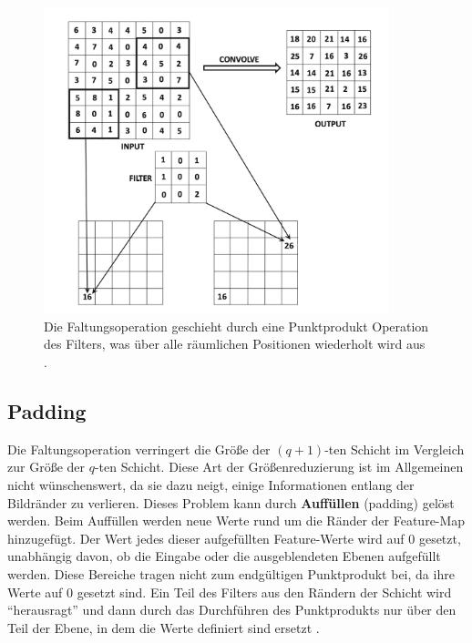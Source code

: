     \begin{figure}[H]
        \centering
        \includegraphics[width=10cm]{kapitel2/conv_layers.png}
        \caption[Die Faltung in einem CNN]{Die Faltungsoperation geschieht durch eine Punktprodukt Operation des Filters, was über alle räumlichen Positionen wiederholt wird aus \cite*[321]{Aggarwal2018}.}
        \label{Kap2:Conv}
    \end{figure}

    \subsection{Padding}
    Die Faltungsoperation verringert die Größe der $(q + 1)$-ten Schicht im Vergleich zur Größe der $q$-ten Schicht. Diese Art der Größenreduzierung ist im Allgemeinen nicht wünschenswert, da sie dazu neigt, einige Informationen entlang der Bildränder zu verlieren. Dieses Problem kann durch \textbf{Auffüllen} (padding) gelöst werden. Beim Auffüllen werden neue Werte rund um die Ränder der Feature-Map hinzugefügt. Der Wert jedes dieser aufgefüllten Feature-Werte wird auf 0 gesetzt, unabhängig davon, ob die Eingabe oder die ausgeblendeten Ebenen aufgefüllt werden. Diese Bereiche tragen nicht zum endgültigen Punktprodukt bei, da ihre Werte auf 0 gesetzt sind. Ein Teil des Filters aus den Rändern der Schicht wird \enquote{herausragt} und dann durch das Durchführen des Punktprodukts nur über den Teil der Ebene, in dem die Werte definiert sind ersetzt \cite*[323]{Aggarwal2018}.


